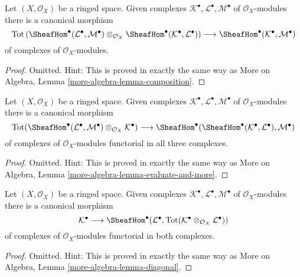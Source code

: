 \begin{lemma}
\label{lemma-composition}
Let $(X, \mathcal{O}_X)$ be a ringed space. Given complexes
$\mathcal{K}^\bullet, \mathcal{L}^\bullet, \mathcal{M}^\bullet$
of $\mathcal{O}_X$-modules there is a canonical morphism
$$
\text{Tot}\left(
\SheafHom^\bullet(\mathcal{L}^\bullet, \mathcal{M}^\bullet)
\otimes_{\mathcal{O}_X}
\SheafHom^\bullet(\mathcal{K}^\bullet, \mathcal{L}^\bullet)
\right)
\longrightarrow
\SheafHom^\bullet(\mathcal{K}^\bullet, \mathcal{M}^\bullet)
$$
of complexes of $\mathcal{O}_X$-modules.
\end{lemma}

\begin{proof}
Omitted. Hint: This is proved in exactly the same way as
More on Algebra, Lemma \ref{more-algebra-lemma-composition}.
\end{proof}

\begin{lemma}
\label{lemma-evaluate-and-more}
Let $(X, \mathcal{O}_X)$ be a ringed space. Given complexes
$\mathcal{K}^\bullet, \mathcal{L}^\bullet, \mathcal{M}^\bullet$
of $\mathcal{O}_X$-modules there is a canonical morphism
$$
\text{Tot}(\SheafHom^\bullet(\mathcal{L}^\bullet,
\mathcal{M}^\bullet) \otimes_{\mathcal{O}_X} \mathcal{K}^\bullet)
\longrightarrow
\SheafHom^\bullet(\SheafHom^\bullet(\mathcal{K}^\bullet,
\mathcal{L}^\bullet), \mathcal{M}^\bullet)
$$
of complexes of $\mathcal{O}_X$-modules functorial in all three complexes.
\end{lemma}

\begin{proof}
Omitted. Hint: This is proved in exactly the same way as
More on Algebra, Lemma \ref{more-algebra-lemma-evaluate-and-more}.
\end{proof}

\begin{lemma}
\label{lemma-diagonal}
Let $(X, \mathcal{O}_X)$ be a ringed space. Given complexes
$\mathcal{K}^\bullet, \mathcal{L}^\bullet, \mathcal{M}^\bullet$
of $\mathcal{O}_X$-modules there is a canonical morphism
$$
\mathcal{K}^\bullet
\longrightarrow
\SheafHom^\bullet(\mathcal{L}^\bullet,
\text{Tot}(\mathcal{K}^\bullet \otimes_{\mathcal{O}_X} \mathcal{L}^\bullet))
$$
of complexes of $\mathcal{O}_X$-modules functorial in both complexes.
\end{lemma}

\begin{proof}
Omitted. Hint: This is proved in exactly the same way as
More on Algebra, Lemma \ref{more-algebra-lemma-diagonal}.
\end{proof}

